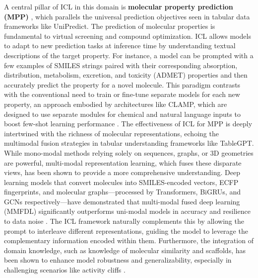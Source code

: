 \documentclass[11pt]{article}
\begin{document}
A central pillar of ICL in this domain is \textbf{molecular property prediction (MPP)} , which parallels the universal prediction objectives seen in tabular data frameworks like UniPredict. The prediction of molecular properties is fundamental to virtual screening and compound optimization. ICL allows models to adapt to new prediction tasks at inference time by understanding textual descriptions of the target property. For instance, a model can be prompted with a few examples of SMILES strings paired with their corresponding absorption, distribution, metabolism, excretion, and toxicity (ADMET) properties and then accurately predict the property for a novel molecule. This paradigm contrasts with the conventional need to train or fine-tune separate models for each new property, an approach embodied by architectures like CLAMP, which are designed to use separate modules for chemical and natural language inputs to boost few-shot learning performance \cite{ref556}. The effectiveness of ICL for MPP is deeply intertwined with the richness of molecular representations, echoing the multimodal fusion strategies in tabular understanding frameworks like TableGPT. While mono-modal methods relying solely on sequences, graphs, or 3D geometries are powerful, multi-modal representation learning, which fuses these disparate views, has been shown to provide a more comprehensive understanding. Deep learning models that convert molecules into SMILES-encoded vectors, ECFP fingerprints, and molecular graphs---processed by Transformers, BiGRUs, and GCNs respectively---have demonstrated that multi-modal fused deep learning (MMFDL) significantly outperforms uni-modal models in accuracy and resilience to data noise \cite{ref557}. The ICL framework naturally complements this by allowing the prompt to interleave different representations, guiding the model to leverage the complementary information encoded within them. Furthermore, the integration of domain knowledge, such as knowledge of molecular similarity and scaffolds, has been shown to enhance model robustness and generalizability, especially in challenging scenarios like activity cliffs \cite{ref558}.
\end{document}
